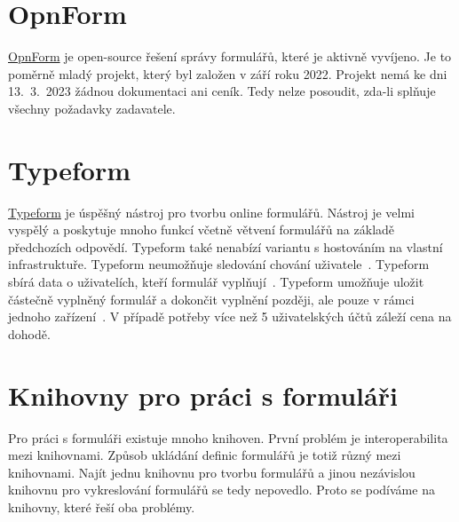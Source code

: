 \section*{OpnForm}\label{sec:opnform}

\href{https://opnform.com/}{OpnForm} je open-source řešení správy formulářů, které je aktivně vyvíjeno.
Je to poměrně mladý projekt, který byl založen v září roku 2022.
Projekt nemá ke dni 13.~3.~2023 žádnou dokumentaci ani ceník.
Tedy nelze posoudit, zda-li splňuje všechny požadavky zadavatele.

\section*{Typeform}\label{sec:typeform}

\href{https://www.typeform.com/}{Typeform} je úspěšný nástroj pro tvorbu online formulářů.
Nástroj je velmi vyspělý a poskytuje mnoho funkcí včetně větvení formulářů na základě předchozích odpovědí.
Typeform také nenabízí variantu s hostováním na vlastní infrastruktuře.
Typeform neumožňuje sledování chování uživatele~\cite{user-tracking-typeform}.
Typeform sbírá data o uživatelích, kteří formulář vyplňují~\cite{user-data-typeform}.
Typeform umožňuje uložit částečně vyplněný formulář a dokončit vyplnění později, ale pouze v rámci jednoho zařízení~\cite{save-and-return-typeform}.
V případě potřeby více než 5 uživatelských účtů záleží cena na dohodě.

\section*{Knihovny pro práci s formuláři}\label{sec:knihovny-pro-praci-s-formulari}

Pro práci s formuláři existuje mnoho knihoven.
První problém je interoperabilita mezi knihovnami.
Způsob ukládání definic formulářů je totiž různý mezi knihovnami.
Najít jednu knihovnu pro tvorbu formulářů a jinou nezávislou knihovnu pro vykreslování formulářů se tedy nepovedlo.
Proto se podíváme na knihovny, které řeší oba problémy.

